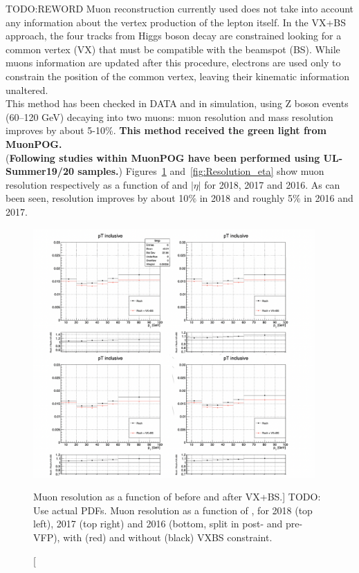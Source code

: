 TODO:REWORD Muon reconstruction currently used does not take into account any information about the 
vertex production of the lepton itself. %
In the VX+BS approach, the four tracks from Higgs boson decay are constrained looking for a common 
vertex (VX) that must be compatible with the beamspot (BS). 
While muons information are updated after this procedure,
electrons are used only to constrain the position of the common vertex, 
leaving their kinematic information unaltered. \\
This method has been checked in DATA and in simulation, using Z boson events (60--120 GeV)
decaying into two muons: muon \pT resolution and mass resolution improves by about 5-10\%. 
\textbf{This method received the green light from MuonPOG.}\\
(\textbf{Following studies within MuonPOG have been performed using UL-Summer19/20 samples.})
Figures~\ref{fig:Resolution_pT} and~\ref{fig:Resolution_eta} show muon resolution respectively 
as a function of \pT and $|\eta|$ for 2018, 2017 and 2016.
As can been seen, resolution improves by about 10$\%$ in 2018 and roughly 5$\%$ in 2016 and 2017.
\begin{figure}[!htbp]
\begin{center}
	\includegraphics[width=0.96\textwidth]{figures/higgsmassmeas/vxbs/vxbs_muon_pTresol_vs_pT.png}
    \caption
    [Muon \pT resolution as a function of \pT before and after VX+BS.]
    {TODO: Use actual PDFs. Muon \pT resolution as a function of \pT, for 2018 (top left), 2017 (top right) 
and 2016 (bottom, split in post- and pre-VFP), with (red) and without (black) VXBS constraint.}
\label{fig:Resolution_pT}
\end{center}
\end{figure}
